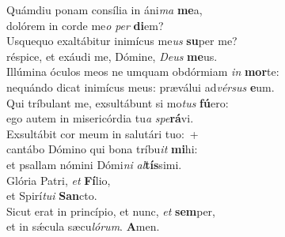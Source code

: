 \evenverse Quámdiu ponam consília in áni\textit{ma} \textbf{me}a,~\*\\
\evenverse dolórem in corde me\textit{o} \textit{per} \textbf{di}em?\\
\oddverse Usquequo exaltábitur inimícus me\textit{us} \textbf{su}per me?~\*\\
\oddverse réspice, et exáudi me, Dómine, \textit{De}\textit{us} \textbf{me}us.\\
\evenverse Illúmina óculos meos ne umquam obdórmiam \textit{in} \textbf{mor}te:~\*\\
\evenverse nequándo dicat inimícus meus: præválui ad\textit{vér}\textit{sus} \textbf{e}um.\\
\oddverse Qui tríbulant me, exsultábunt si mo\textit{tus} \textbf{fú}ero:~\*\\
\oddverse ego autem in misericórdia tu\textit{a} \textit{spe}\textbf{rá}vi.\\
\evenverse Exsultábit cor meum in salutári tuo:~+\\
\evenverse  cantábo Dómino qui bona tríbu\textit{it} \textbf{mi}hi:~\*\\
\evenverse et psallam nómini Dómi\textit{ni} \textit{al}\textbf{tís}simi.\\
\oddverse Glória Patri, \textit{et} \textbf{Fí}lio,~\*\\
\oddverse et Spirí\textit{tu}\textit{i} \textbf{San}cto.\\
\evenverse Sicut erat in princípio, et nunc, \textit{et} \textbf{sem}per,~\*\\
\evenverse et in sǽcula sæcu\textit{ló}\textit{rum}. \textbf{A}men.\\
